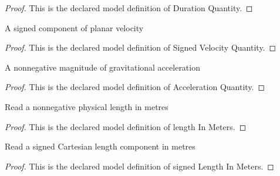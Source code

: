 \begin{proof}
  This is the declared model definition of Duration Quantity.
\end{proof}
\begin{definition}
  \label{def:physics:phyx-mini-0738:phyxminiproblems-problemphyxmini0738-signedvelocityquantity}
  A signed component of planar velocity
\end{definition}
\begin{proof}
  This is the declared model definition of Signed Velocity Quantity.
\end{proof}
\begin{definition}
  \label{def:physics:phyx-mini-0738:phyxminiproblems-problemphyxmini0738-accelerationquantity}
  A nonnegative magnitude of gravitational acceleration
\end{definition}
\begin{proof}
  This is the declared model definition of Acceleration Quantity.
\end{proof}
\begin{definition}
  \label{def:physics:phyx-mini-0738:phyxminiproblems-problemphyxmini0738-lengthinmeters}
  Read a nonnegative physical length in metres
\end{definition}
\begin{proof}
  This is the declared model definition of length In Meters.
\end{proof}
\begin{definition}
  \label{def:physics:phyx-mini-0738:phyxminiproblems-problemphyxmini0738-signedlengthinmeters}
  Read a signed Cartesian length component in metres
\end{definition}
\begin{proof}
  This is the declared model definition of signed Length In Meters.
\end{proof}
